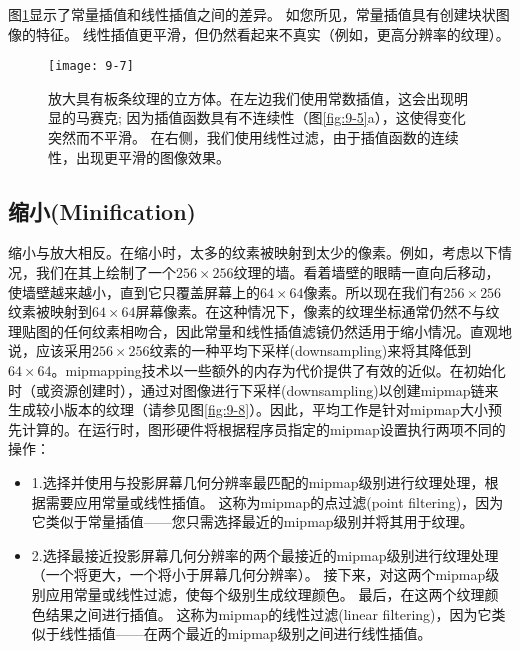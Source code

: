 \begin{flushleft}
图\ref{fig:9-7}显示了常量插值和线性插值之间的差异。 如您所见，常量插值具有创建块状图像的特征。 线性插值更平滑，但仍然看起来不真实（例如，更高分辨率的纹理）。\\
\end{flushleft}

\begin{figure}[h]
    \texttt{[image: 9-7]}
    \centering
    \caption{放大具有板条纹理的立方体。在左边我们使用常数插值，这会出现明显的马赛克; 因为插值函数具有不连续性（图\ref{fig:9-5}a），这使得变化突然而不平滑。 在右侧，我们使用线性过滤，由于插值函数的连续性，出现更平滑的图像效果。}
    \label{fig:9-7}
\end{figure}

\subsection{缩小(Minification)}
\begin{flushleft}
缩小与放大相反。在缩小时，太多的纹素被映射到太少的像素。例如，考虑以下情况，我们在其上绘制了一个$256\times 256$纹理的墙。看着墙壁的眼睛一直向后移动，使墙壁越来越小，直到它只覆盖屏幕上的$64\times 64$像素。所以现在我们有$256\times 256$纹素被映射到$64\times 64$屏幕像素。在这种情况下，像素的纹理坐标通常仍然不与纹理贴图的任何纹素相吻合，因此常量和线性插值滤镜仍然适用于缩小情况。直观地说，应该采用$256\times 256$纹素的一种平均下采样(downsampling)来将其降低到$64\times 64$。mipmapping技术以一些额外的内存为代价提供了有效的近似。在初始化时（或资源创建时），通过对图像进行下采样(downsampling)以创建mipmap链来生成较小版本的纹理（请参见图\ref{fig:9-8}）。因此，平均工作是针对mipmap大小预先计算的。在运行时，图形硬件将根据程序员指定的mipmap设置执行两项不同的操作：\\
\end{flushleft}

\begin{itemize}
  \item 1.选择并使用与投影屏幕几何分辨率最匹配的mipmap级别进行纹理处理，根据需要应用常量或线性插值。 这称为mipmap的点过滤(point filtering)，因为它类似于常量插值——您只需选择最近的mipmap级别并将其用于纹理。
  \item 2.选择最接近投影屏幕几何分辨率的两个最接近的mipmap级别进行纹理处理（一个将更大，一个将小于屏幕几何分辨率）。 接下来，对这两个mipmap级别应用常量或线性过滤，使每个级别生成纹理颜色。 最后，在这两个纹理颜色结果之间进行插值。 这称为mipmap的线性过滤(linear filtering)，因为它类似于线性插值——在两个最近的mipmap级别之间进行线性插值。
\end{itemize}

